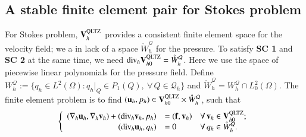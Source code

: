 \documentclass[12pt,showkeys]{amsart}
\begin{document}
\subsection{A stable finite element pair for Stokes problem}
For Stokes problem, $\mathbf{V}_h^{\rm QLTZ}$ provides a consistent finite element space for the velocity field; we a in lack of a space $\mathring{W}_h^{\mathcal{Q}}$ for the pressure. To satisfy \textbf{SC 1} and \textbf{SC 2} at the same time, we need $\mathrm{div}_h\mathbf{V}_{h0}^{\rm QLTZ}= \mathring{W}_h^{\mathcal{Q}}$. Here we use the space of piecewise linear polynomials for the pressure field. Define $W_h^{\mathcal{Q}}:=\{q_h\in L^2(\Omega):q_h|_Q\in P_1(Q),\ \forall\,Q\in\mathcal{Q}_h\}$ and $\mathring{W}_h^{\mathcal{Q}}=W_h^{\mathcal{Q}}\cap L^2_0(\Omega)$. The finite element problem is to find $(\mathbf{u}_h,p_h)\in\mathbf{V}_{h0}^{\rm QLTZ}\times \mathring{W}_h^{\mathcal{Q}}$, such that
\begin{equation}\label{eq:stokesfep}
\left\{
\begin{array}{rll}
(\nabla_h\mathbf{u}_h,\nabla_h\mathbf{v}_h)+(\mathrm{div}_h\mathbf{v}_h,p_h)&=(\mathbf{f},\mathbf{v}_h) & \forall\,\mathbf{v}_h\in \mathbf{V}_{h0}^{\rm QLTZ}; \\ 
(\mathrm{div}_h\mathbf{u}_h,q_h)&=0 & \forall\,q_h\in \mathring{W}_h^{\mathcal{Q}}.
\end{array}
\right.
\end{equation}
\end{document}
